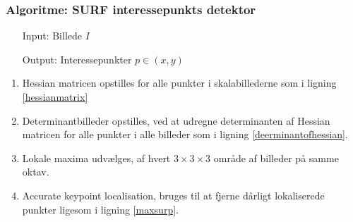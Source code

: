 \subsubsection*{Algoritme: SURF interessepunkts detektor}
\begin{enumerate}
\item[Input:] Billede $I$
\item[Output:] Interessepunkter $p \in (x,y)$
\end{enumerate}
\begin{enumerate}
\item {Hessian matricen opstilles for alle punkter i skalabillederne som i ligning \eqref{hessianmatrix}}
\item Determinantbilleder opstilles, ved at udregne determinanten af Hessian matricen for alle punkter i alle billeder som i ligning \eqref{deerminantofhessian}.
\item Lokale maxima udvælges, af hvert $3\times3\times3$ område af billeder på samme oktav.
\item Accurate keypoint localisation, bruges til at fjerne dårligt lokaliserede punkter ligesom i ligning \eqref{maxsurp}.
\end{enumerate}